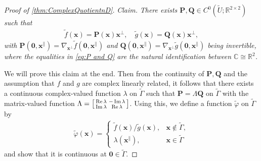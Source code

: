 \documentclass{article}
\newcommand{\Albert}[1]{{\color[rgb]{0.2,0.4,0.8}\textbf{Albert: } #1}}
\theoremstyle{theorem}
\theoremstyle{definition}
\newenvironment{claim}
{\par\medskip
 \phantomsection
 \noindent\textit{Claim.}\itshape
}
{\par\medskip}
\def\CC{\mathbb{C}}
\def\RR{\mathbb{R}}
\def\bP{\mathbf{P}}
\def\bQ{\mathbf{Q}}
\def\ba{\mathbf{a}}
\def\bx{\mathbf{x}}
\def\bzero{\mathbf{0}}
\renewcommand{\Im}{\operatorname{Im}}
\renewcommand{\Re}{\operatorname{Re}}
\begin{document}
\begin{proof}[Proof of \autoref{thm:ComplexQuotientnD}]
\begin{claim}\label{cl:P and Q}
There exists \(\bP,\bQ\in C^{0}(\tilde U;\RR^{2\times 2})\) such that 
    \begin{align}\label{eq:P and Q}
        \tilde f(\bx) = \bP(\bx)\bx^\perp,\quad
        \tilde g(\bx) = 
        \bQ(\bx)\bx^\perp,
    \end{align}
    with $\bP(\bzero,\bx^\parallel)=\nabla_{\bx^\perp}\tilde f(\bzero,\bx^\parallel)$ and $\bQ(\bzero,\bx^\parallel)=\nabla_{\bx^\perp}\tilde g(\bzero,\bx^\parallel)$ being invertible, where the equalities  in \eqref{eq:P and Q} are the natural identification between $\CC\cong \RR^2$. 
\end{claim}
We will prove this claim at the end.
Then from the continuity of $\bP,\bQ$ and the assumption that \(f\) and \(g\) are complex linearly related, it follows that there exists a continuous complex-valued function \( \lambda\) on $\tilde \Gamma$ such that
     \(\bP = \Lambda\bQ\) on \(\tilde\Gamma\) with the matrix-valued function  $\Lambda=\begin{bsmallmatrix}
         \Re\lambda & -\Im\lambda\\\Im\lambda&\Re\lambda
     \end{bsmallmatrix}$.
Using this, we define a function $\tilde \varphi$ on $\tilde \Gamma$ by
    \begin{align*}
    \tilde\varphi(\bx)=
    \begin{cases}
			\tilde f(\bx)/\tilde g(\bx), & \bx \notin \tilde\Gamma,\\
            \lambda(\bx^\parallel), &  \bx \in \tilde \Gamma
		 \end{cases}
\end{align*}
and show that it is continuous at $\bzero\in \tilde \Gamma$.
    


\end{proof}
\end{document}
